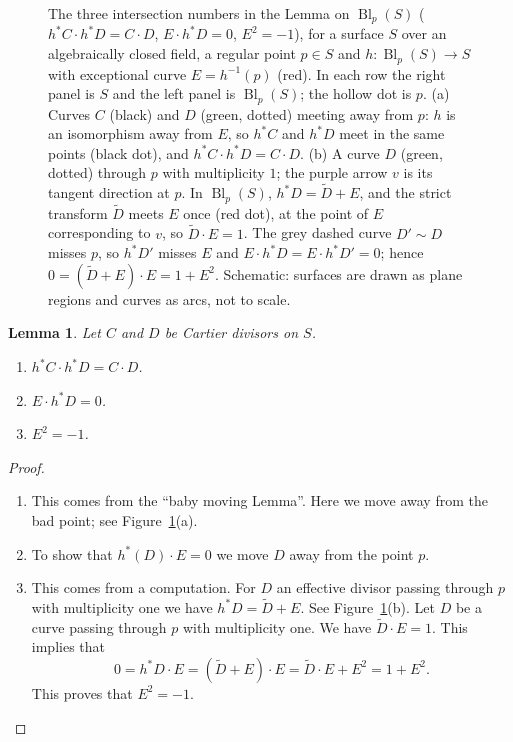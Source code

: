 \documentclass[12pt]{article}
\numberwithin{equation}{section}
\newtheorem{lemma}[theorem]{Lemma}
\theoremstyle{definition}
\theoremstyle{remark}
\newcommand{\Bl}{\operatorname{Bl}}
\begin{document}
\begin{figure}[H]
\centering

\caption{The three intersection numbers in the Lemma on $\Bl_p(S)$ ($h^*C\cdot h^*D=C\cdot D$, $E\cdot h^*D=0$, $E^2=-1$), for a surface $S$ over an algebraically closed field, a regular point $p\in S$ and $h\colon\Bl_p(S)\to S$ with exceptional curve $E=h^{-1}(p)$ (red). In each row the right panel is $S$ and the left panel is $\Bl_p(S)$; the hollow dot is $p$. (a) Curves $C$ (black) and $D$ (green, dotted) meeting away from $p$: $h$ is an isomorphism away from $E$, so $h^*C$ and $h^*D$ meet in the same points (black dot), and $h^*C\cdot h^*D=C\cdot D$. (b) A curve $D$ (green, dotted) through $p$ with multiplicity $1$; the purple arrow $v$ is its tangent direction at $p$. In $\Bl_p(S)$, $h^*D=\widetilde D+E$, and the strict transform $\widetilde D$ meets $E$ once (red dot), at the point of $E$ corresponding to $v$, so $\widetilde D\cdot E=1$. The grey dashed curve $D'\sim D$ misses $p$, so $h^*D'$ misses $E$ and $E\cdot h^*D=E\cdot h^*D'=0$; hence $0=(\widetilde D+E)\cdot E=1+E^2$. Schematic: surfaces are drawn as plane regions and curves as arcs, not to scale.}\label{fig:blowup-intersections}
\end{figure}

\begin{lemma}
	Let $C$ and $D$ be Cartier divisors on $S$.
	\begin{enumerate}
		\item $h^*C\cdot h^*D = C\cdot D$.
		\item $E\cdot h^*D=0$.
		\item $E^2=-1$.
	\end{enumerate}
\end{lemma}
\begin{proof}
	\begin{enumerate}
		\item This comes from the ``baby moving Lemma''. 
		Here we move away from the bad point; see Figure~\ref{fig:blowup-intersections}(a).
		\item To show that $h^*(D)\cdot E=0$ we move $D$ away from the point $p$.
		\item This comes from a computation.
		For $D$ an effective divisor passing through $p$ with multiplicity one we have $h^*D = \widetilde{D}+E$. 
		See Figure~\ref{fig:blowup-intersections}(b).
		Let $D$ be a curve passing through $p$ with multiplicity one. 
		We have $\widetilde{D}\cdot E =1$. 
		This implies that 
		$$0 = h^*D \cdot E = (\widetilde{D}+E)\cdot E = \widetilde{D}\cdot E + E^2 = 1+E^2.$$
		This proves that $E^2=-1$.
	\end{enumerate}
\end{proof}
\end{document}
